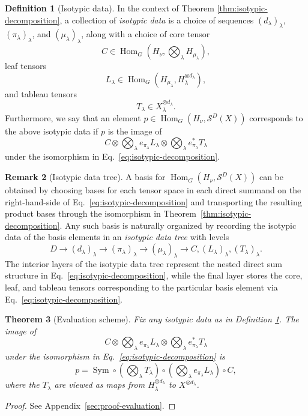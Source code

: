 \documentclass[11pt]{article}
\newcommand{\scS}{\mathcal{S}}
\newcommand{\HomG}[2]{\operatorname{Hom}_G\!\left(#1,#2\right)}
\newcommand{\Sym}{\operatorname{Sym}}
\newtheorem{theorem}{Theorem}[section]
\theoremstyle{definition}
\newtheorem{definition}[theorem]{Definition}
\newtheorem{remark}[theorem]{Remark}
\begin{document}
\begin{definition}[Isotypic data]\label{def:isotypic-data}
  In the context of Theorem \ref{thm:isotypic-decomposition}, a collection of \emph{isotypic data} is a choice of sequences $(d_\lambda)_\lambda$, $(\pi_\lambda)_\lambda$, and $(\mu_\lambda)_\lambda$, along with
  a choice of core tensor
  \[
    C\in \HomG{H_\nu}{\bigotimes_\lambda H_{\mu_\lambda}},
  \]
  leaf tensors
  \[
    L_\lambda\in \HomG{H_{\mu_\lambda}}{H_\lambda^{\otimes d_\lambda}},
  \]
  and tableau tensors
  \[
    T_\lambda\in X_\lambda^{\otimes d_\lambda}.
  \]
  Furthermore, we say that an element $p \in \HomG{H_\nu}{\scS^D(X)}$ corresponds to the above isotypic data if $p$ is the image of
  \[
    C
    \otimes
    \bigotimes_\lambda
    e_{\pi_\lambda} L_\lambda
    \otimes
    \bigotimes_\lambda
    e_{\pi_\lambda}^* T_\lambda
  \]
  under the isomorphism in Eq.~\eqref{eq:isotypic-decomposition}.
\end{definition}

\begin{remark}[Isotypic data tree]\label{rem:isotypic-data-tree}
  A basis for $\HomG{H_\nu}{\scS^D(X)}$ can be obtained by choosing bases for each tensor space in each direct summand on the right-hand-side of Eq.~\eqref{eq:isotypic-decomposition} and transporting the resulting product bases through the isomorphism in Theorem~\ref{thm:isotypic-decomposition}.
  Any such basis is naturally organized by recording the isotypic data of the basis elements in an \emph{isotypic data tree} with levels
  \[
    D \longrightarrow (d_\lambda)_\lambda \longrightarrow (\pi_\lambda)_\lambda \longrightarrow (\mu_\lambda)_\lambda \longrightarrow C, (L_\lambda)_\lambda, (T_\lambda)_\lambda.
  \]
  The interior layers of the isotypic data tree represent the nested direct sum structure in Eq.~\eqref{eq:isotypic-decomposition}, while the final layer stores the core, leaf, and tableau tensors corresponding to the particular basis element via Eq.~\eqref{eq:isotypic-decomposition}.
\end{remark}

\begin{theorem}[Evaluation scheme]\label{thm:evaluation}
  Fix any isotypic data as in Definition \ref{def:isotypic-data}. The image of
  \begin{equation}\label{eq:isotypic-data-tensor}
    C
    \otimes
    \bigotimes_\lambda
    e_{\pi_\lambda} L_\lambda
    \otimes
    \bigotimes_\lambda
    e_{\pi_\lambda}^* T_\lambda
  \end{equation}
  under the isomorphism in Eq.~\eqref{eq:isotypic-decomposition} is
  \begin{equation}\label{eq:evaluation}
    p
    =
    \Sym
    \circ
    \left(\bigotimes_\lambda T_\lambda\right)
    \circ
    \left(\bigotimes_\lambda e_{\pi_\lambda} L_\lambda\right)
    \circ
    C,
  \end{equation}
  where the $T_\lambda$ are viewed as maps from $H_\lambda^{\otimes d_\lambda}$ to $X^{\otimes d_\lambda}$.
\end{theorem}
\begin{proof}
  See Appendix~\ref{sec:proof-evaluation}.
\end{proof}
\end{document}
